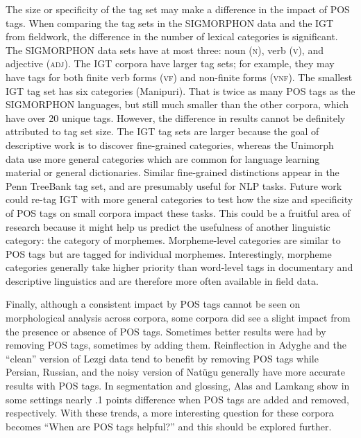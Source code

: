 The size or specificity of the tag set may make a difference in the impact of POS tags. When comparing the tag sets in the SIGMORPHON data and the IGT from fieldwork, the difference in the number of lexical categories is significant. The SIGMORPHON data sets have at most three: noun (\textsc{n}), verb (\textsc{v}), and adjective (\textsc{adj}). The IGT corpora have larger tag sets; for example, they may have tags for both finite verb forms (\textsc{vf}) and non-finite forms (\textsc{vnf}). The smallest IGT tag set has six categories (Manipuri). That is twice as many POS tags as the SIGMORPHON languages, but still much smaller than the other corpora, which have over 20 unique tags.  However, the difference in results cannot be definitely attributed to tag set size. The IGT tag sets are larger because the goal of descriptive work is to discover fine-grained categories, whereas the Unimorph data use more general categories which are common for language learning material or general dictionaries. Similar fine-grained distinctions appear in the Penn TreeBank tag set, and are presumably useful for NLP tasks.
Future work could re-tag IGT with more general categories to test how the size and specificity of POS tags on small corpora impact these tasks. This could be a fruitful area of research because it might help us predict the usefulness of another linguistic category: the category of morphemes. Morpheme-level categories are similar to POS tags but are tagged for individual morphemes. Interestingly, morpheme categories generally take higher priority than word-level tags in documentary and descriptive linguistics and are therefore more often available in field data.



Finally, although a consistent impact by POS tags cannot be seen on morphological analysis across corpora, some corpora did see a slight impact from the presence or absence of POS tags. Sometimes better results were had by removing POS tags, sometimes by adding them. Reinflection in Adyghe and the ``clean'' version of Lezgi data tend to benefit by removing POS tags while Persian, Russian, and the noisy version of Nat\"ugu generally have more accurate results with POS tags. In segmentation and glossing, Alas and Lamkang show in some settings nearly .1 points difference when POS tags are added and removed, respectively. With these trends, a more interesting question for these corpora becomes ``When are POS tags helpful?'' and this should be explored further. 


